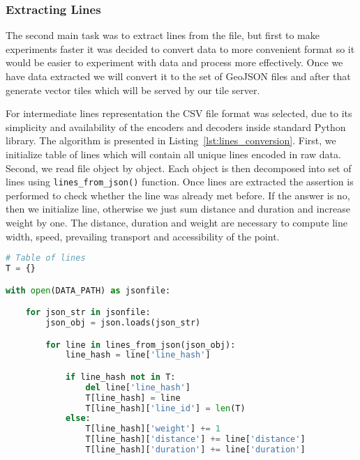 \subsubsection{ Extracting Lines }

The second main task was to extract lines from the file, but first to make experiments faster
it was decided to convert data to more convenient format so it would be easier to
experiment with data and process more effectively. Once we have data extracted we will convert it
to the set of GeoJSON files and after that generate vector tiles which will be served by our
tile server.

For intermediate lines representation the CSV file format was selected, due to its simplicity
and availability of the encoders and decoders inside standard Python library. The algorithm is
presented in Listing~\ref{lst:lines_conversion}. First, we initialize table of lines which will
contain all unique lines encoded in raw data. Second, we read file object by object. Each object
is then decomposed into set of lines using \lstinline|lines_from_json()| function. Once lines are
extracted the assertion is performed to check whether the line was already met before. If the
answer is no, then we initialize line, otherwise we just sum distance and duration
and increase weight by one. The distance, duration and weight are necessary to compute
line width, speed, prevailing transport and accessibility of the point.

\begin{lstlisting}[language=python, caption=Lines conversion., label={lst:lines_conversion}]
# Table of lines
T = {}

with open(DATA_PATH) as jsonfile:

    for json_str in jsonfile:
        json_obj = json.loads(json_str)

        for line in lines_from_json(json_obj):
            line_hash = line['line_hash']

            if line_hash not in T:
                del line['line_hash']
                T[line_hash] = line
                T[line_hash]['line_id'] = len(T)
            else:
                T[line_hash]['weight'] += 1
                T[line_hash]['distance'] += line['distance']
                T[line_hash]['duration'] += line['duration']
\end{lstlisting}


